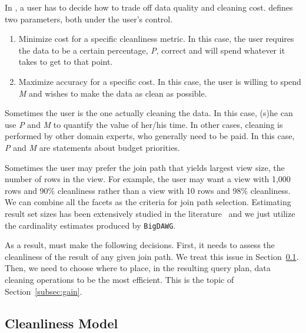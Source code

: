 In \dcv, a user has to decide how to trade off data quality and cleaning cost. 
\dcv defines two parameters, both under the user's control.

\begin{enumerate}
\item Minimize cost for a specific cleanliness metric. In this case, the user requires the data to be a certain percentage, \emph{P}, correct and will spend whatever it takes to get to that point.

\item Maximize accuracy for a specific cost. In this case, the user is willing to spend \emph{M} and wishes to make the data as clean as possible.
\end{enumerate}

Sometimes the user is the one actually cleaning the data. In this case, (s)he can use \emph{P} and \emph{M} to quantify the value of her/his time. 
In other cases, cleaning is performed by other domain experts, who generally need to be paid. In this case, \emph{P} and \emph{M} are statements about budget priorities.

Sometimes the user may prefer the join path that yields largest view size, \ie the number of rows in the view. 
For example, the user may want a view with 1,000 rows and 90\% cleanliness rather than a view with 10 rows and 98\% cleanliness. 
We can combine all the facets as the criteria for join path selection.
Estimating result set sizes has been extensively studied in the literature~\cite{DBLP:conf/sigmod/IoannidisP95} and we just utilize the cardinality estimates produced by \texttt{BigDAWG}.

As a result, \dcv must make the following decisions. 
First, it needs to assess the cleanliness of the result of any given join path. We treat this issue in Section~\ref{subsec:model}. 
Then, we need to choose where to place, in the resulting query plan, data cleaning operations to be the most efficient. This is the topic of Section~\ref{subsec:gain}.


\subsection{Cleanliness Model}
\label{subsec:model}

